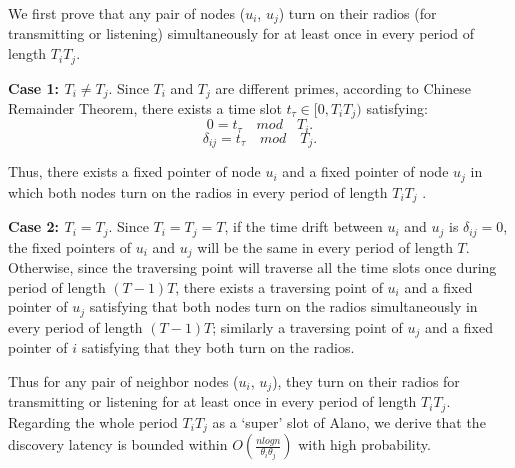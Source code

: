 \begin{IEEEproof}
We first prove that any pair of nodes ($u_i$, $u_j$) turn on their radios (for transmitting or listening) simultaneously for at least once in every period of length $T_iT_j$.

\textbf{Case 1: $T_i \neq T_j$}. Since $T_i$ and $T_j$ are different primes,
according to Chinese Remainder Theorem\cite{XX}, there exists a time slot $t_\tau \in \lbrack 0,T_iT_j ) $ satisfying:
\begin{equation}
\label{case1.1}
0 = t_\tau  \quad mod \quad  T_i.
\end{equation}
\begin{equation}
\label{case1.2}
\delta_{ij} = t_\tau  \quad mod \quad  T_j.
\end{equation}

Thus, there exists a fixed pointer of node $u_i$
and a fixed pointer of node $u_j$ in which both nodes turn on the radios in every period of length $T_iT_j$  .

\textbf{Case 2: $T_i = T_j$}. Since $T_i = T_j = T$, if the time drift between $u_i$ and $u_j$ is $\delta_{ij} = 0$, the fixed pointers of $u_i$ and $u_j$ will be the same in every period of length $T$.
Otherwise, since the traversing point will traverse all the time slots once during period of length $(T-1)T$,
there exists a traversing point of $u_i$ and a fixed pointer
of $u_j$ satisfying that both nodes turn on the radios simultaneously in every period of length $(T-1)T$; similarly a traversing point of $u_j$ and a fixed pointer of $i$ satisfying that they both turn on the radios.

Thus for any pair of neighbor nodes ($u_i$, $u_j$), they turn on their radios for transmitting or listening for at least once in every period of length $T_iT_j$. Regarding
the whole period $T_iT_j$ as a `super' slot of Alano, we derive that the discovery latency is bounded within $O(\frac{nlogn}{\theta_i\theta_j})$ with high probability.
\end{IEEEproof}




